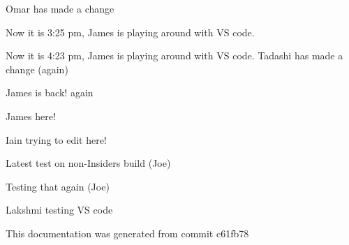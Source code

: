 \label{index_md_repo_README}%
%
Omar has made a change

Now it is 3\+:25 pm, James is playing around with VS code.

Now it is 4\+:23 pm, James is playing around with VS code. Tadashi has made a change (again)

James is back! again

James here!

Iain trying to edit here!

Latest test on non-\/\+Insiders build (Joe)

Testing that again (Joe)

Lakshmi testing VS code

This documentation was generated from commit c61fb78 